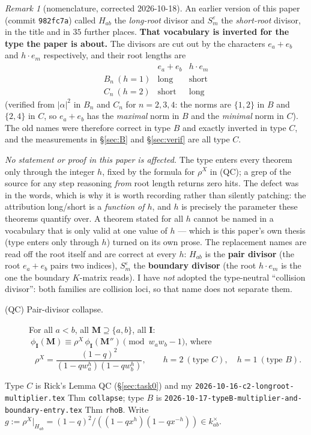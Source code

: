 \documentclass[11pt]{article}
\theoremstyle{plain}
\theoremstyle{definition}
\theoremstyle{remark}
\newtheorem{rem}[thm]{Remark}
\theoremstyle{plain}
\newcommand{\bI}{\mathbf{I}}
\newcommand{\bM}{\mathbf{M}}
\begin{document}
\begin{rem}[nomenclature, corrected 2026-10-18]\label{rem:names}
An earlier version of this paper (commit \texttt{982fc7a}) called $H_{ab}$ the
\emph{long-root} divisor and $S_m^{\varepsilon}$ the \emph{short-root} divisor,
in the title and in $35$ further places.  \textbf{That vocabulary is inverted for
the type the paper is about.}  The divisors are cut out by the characters
$e_a+e_b$ and $h\cdot e_m$ respectively, and their root lengths are
\[
\begin{array}{c|cc}
             & e_a+e_b & h\cdot e_m \\\hline
B_n\ (h=1) & \text{long}  & \text{short} \\
C_n\ (h=2) & \text{short} & \text{long}
\end{array}
\]
(verified from $|\alpha|^2$ in $B_n$ and $C_n$ for $n=2,3,4$: the norms are
$\{1,2\}$ in $B$ and $\{2,4\}$ in $C$, so $e_a+e_b$ has the \emph{maximal} norm
in $B$ and the \emph{minimal} norm in $C$).  The old names were therefore correct
in type $B$ and exactly inverted in type $C$, and the measurements in
\S\ref{sec:B} and \S\ref{sec:verif} are all type $C$.

\emph{No statement or proof in this paper is affected.}  The type enters every
theorem only through the integer $h$, fixed by the formula for $\rho^X$ in (QC);
a grep of the source for any step reasoning \emph{from} root length returns zero
hits.  The defect was in the words, which is why it is worth recording rather
than silently patching: the attribution long/short is a \emph{function of $h$},
and $h$ is precisely the parameter these theorems quantify over.  A theorem
stated for all $h$ cannot be named in a vocabulary that is only valid at one
value of $h$ --- which is this paper's own thesis (type enters only through $h$)
turned on its own prose.  The replacement names are read off the root itself and
are correct at every $h$: $H_{ab}$ is the \textbf{pair divisor} (the root
$e_a+e_b$ pairs two indices), $S_m^{\varepsilon}$ the \textbf{boundary divisor}
(the root $h\cdot e_m$ is the one the boundary $K$-matrix reads).  I have
\emph{not} adopted the type-neutral ``collision divisor'': both families are
collision loci, so that name does not separate them.
\end{rem}

\begin{description}
\item[(QC) Pair-divisor collapse.]  For all $a<b$, all $\bM\supseteq\{a,b\}$, all
  $\bI$: $\ \phi_{\bI}(\bM)\equiv\rho^X\,\phi_{\bI}(\bM'')\pmod{w_aw_b-1}$, where
  \[
     \rho^X=\frac{(1-q)^2}{(1-qw_a^{h})(1-qw_b^{h})},
     \qquad h=2\ (\text{type }C),\quad h=1\ (\text{type }B).
  \]
\end{description}
Type $C$ is Rick's Lemma QC (\S\ref{sec:task0}) and my
\texttt{2026-10-16-c2-longroot-multiplier.tex} Thm \texttt{collapse}; type $B$ is
\texttt{2026-10-17-typeB-multiplier-and-boundary-entry.tex} Thm \texttt{rhoB}.
Write $g:=\rho^X|_{H_{ab}}=(1-q)^2/((1-qx^{h})(1-qx^{-h}))\in k_{ab}^{\times}$.
\end{document}
